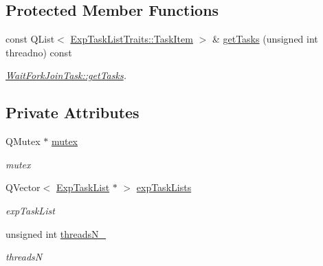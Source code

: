 \subsection*{Protected Member Functions}
\begin{DoxyCompactItemize}
\item 
const Q\+List$<$ \hyperlink{struct_exp_task_list_traits_1_1_task_item}{Exp\+Task\+List\+Traits\+::\+Task\+Item} $>$ \& \hyperlink{class_wait_fork_join_task_a4223b84b25d8c6a8932cd2036a3a8d24}{get\+Tasks} (unsigned int threadno) const 
\begin{DoxyCompactList}\small\item\em \hyperlink{class_wait_fork_join_task_a4223b84b25d8c6a8932cd2036a3a8d24}{Wait\+Fork\+Join\+Task\+::get\+Tasks}. \end{DoxyCompactList}\end{DoxyCompactItemize}
\subsection*{Private Attributes}
\begin{DoxyCompactItemize}
\item 
\hypertarget{class_wait_fork_join_task_aa1c97906b084eb05733474c13749236e}{}Q\+Mutex $\ast$ \hyperlink{class_wait_fork_join_task_aa1c97906b084eb05733474c13749236e}{mutex}\label{class_wait_fork_join_task_aa1c97906b084eb05733474c13749236e}

\begin{DoxyCompactList}\small\item\em mutex \end{DoxyCompactList}\item 
\hypertarget{class_wait_fork_join_task_a1643003d17425a30eda43459e1cc26fe}{}Q\+Vector$<$ \hyperlink{class_exp_task_list}{Exp\+Task\+List} $\ast$ $>$ \hyperlink{class_wait_fork_join_task_a1643003d17425a30eda43459e1cc26fe}{exp\+Task\+Lists}\label{class_wait_fork_join_task_a1643003d17425a30eda43459e1cc26fe}

\begin{DoxyCompactList}\small\item\em exp\+Task\+List \end{DoxyCompactList}\item 
\hypertarget{class_wait_fork_join_task_a1c30fa2a1c1da359ecbff9f30cb58419}{}unsigned int \hyperlink{class_wait_fork_join_task_a1c30fa2a1c1da359ecbff9f30cb58419}{threads\+N\+\_\+}\label{class_wait_fork_join_task_a1c30fa2a1c1da359ecbff9f30cb58419}

\begin{DoxyCompactList}\small\item\em threads\+N \end{DoxyCompactList}\end{DoxyCompactItemize}
